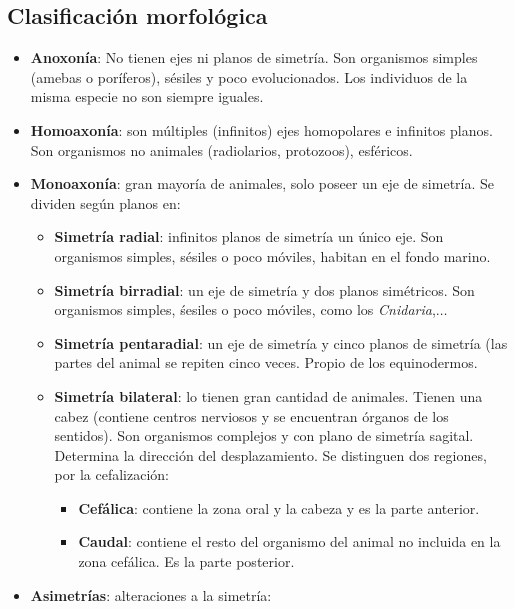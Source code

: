\subsection{Clasificación morfológica}
\begin{itemize}[itemsep=0pt,parsep=0pt,topsep=0pt,partopsep=0pt]
    \item \textbf{Anoxonía}: No tienen ejes ni planos de simetría. Son organismos simples (amebas o poríferos), sésiles y poco evolucionados. Los individuos de la misma especie no son siempre iguales.
    \item\textbf{Homoaxonía}: son múltiples (infinitos) ejes homopolares e infinitos planos. Son organismos no animales (radiolarios, protozoos), esféricos.
    \item\textbf{Monoaxonía}: gran mayoría de animales, solo poseer un eje de simetría. Se dividen según planos en:
    \begin{itemize}[itemsep=0pt,parsep=0pt,topsep=0pt,partopsep=0pt]
        \item \textbf{Simetría radial}: infinitos planos de simetría un único eje. Son organismos simples, sésiles o poco móviles, habitan en el fondo marino.
        \item\textbf{Simetría birradial}: un eje de simetría y dos planos simétricos. Son organismos simples, śesiles o poco móviles, como los \textit{Cnidaria},$\dots$
        \item\textbf{Simetría pentaradial}: un eje de simetría y cinco planos de simetría (las partes del animal se repiten cinco veces. Propio de los equinodermos.
        \item\textbf{Simetría bilateral}: lo tienen gran cantidad de animales. Tienen una cabez (contiene centros nerviosos y se encuentran órganos de los sentidos). Son organismos complejos y con plano de simetría sagital. Determina la dirección del desplazamiento. Se distinguen dos regiones, por la cefalización:
        \begin{itemize}[itemsep=0pt,parsep=0pt,topsep=0pt,partopsep=0pt]
            \item \textbf{Cefálica}: contiene la zona oral y la cabeza y es la parte anterior.
            \item\textbf{Caudal}: contiene el resto del organismo del animal no incluida en la zona cefálica. Es la parte posterior.
        \end{itemize}
    \end{itemize}
    \item\textbf{Asimetrías}: alteraciones a la simetría:

\end{itemize}
